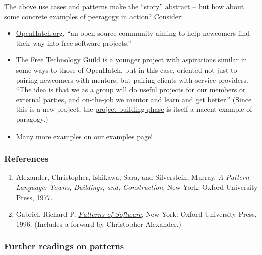 The above use cases and patterns make the ``story'' abstract -- but how
about some concrete examples of peeragogy in action? Consider:

\begin{itemize}
\item
  \href{http://openhatch.org/}{OpenHatch.org}, ``an open source
  community aiming to help newcomers find their way into free software
  projects.''
\item
  The
  \href{http://campus.ftacademy.org/wiki/index.php/Free\_Technology\_Guild}{Free
  Technology Guild} is a younger project with aspirations similar in
  some ways to those of OpenHatch, but in this case, oriented not just
  to pairing newcomers with mentors, but pairing clients with service
  providers. ``The idea is that we as a group will do useful projects
  for our members or external parties, and on-the-job we mentor and
  learn and get better.'' (Since this is a new project, the
  \href{http://campus.ftacademy.org/community/pg/groups/8500/free-technology-guild-working-group/}{project
  building phase} is itself a nacent example of paragogy.)
\item
  Many more examples on our
  \href{http://peeragogy.org/examples/}{examples} page!
\end{itemize}
\subsubsection{References}

\begin{enumerate}
\item
  Alexander, Christopher, Ishikawa, Sara, and Silverstein, Murray,
  \emph{A Pattern Language: Towns, Buildings, and, Construction}, New
  York: Oxford University Press, 1977.
\item
  Gabriel, Richard P.
  \emph{\href{http://dreamsongs.net/Files/PatternsOfSoftware.pdf}{Patterns
  of Software}}, New York: Oxford University Press, 1996. (Includes a
  forward by Christopher Alexander.)
\end{enumerate}
\subsubsection{Further readings on patterns}

